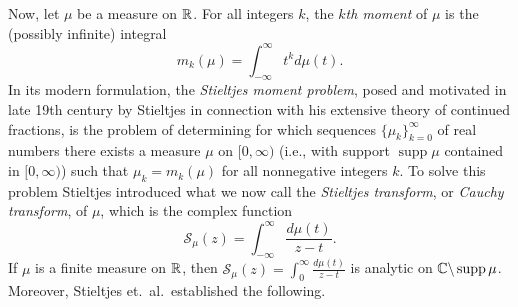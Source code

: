 \documentclass[12pt]{article}
\begin{document}
Now, let $\mu$ be a measure on ${\mathbb R}$. For all integers $k$, the {\it $k$th moment} of $\mu$ is the (possibly infinite) integral
$$m_k(\mu) = \int_{-\infty}^\infty t^k d \mu(t).$$  In its modern formulation, the {\it Stieltjes moment problem}, posed and motivated in late 19th century by Stieltjes in connection with his extensive theory of continued fractions, is the problem of determining for which sequences $\{\mu_k\}_{k = 0}^\infty$ of real numbers there exists a measure $\mu$ on $[0, \infty)$ (i.e., with support $\operatorname{supp} \mu$ contained in $[0,\infty)$) such that $\mu_k = m_k(\mu)$ for all nonnegative integers $k$.  To solve this problem Stieltjes introduced what we now call the {\it Stieltjes transform}, or {\it Cauchy transform},  of $\mu$, which is the complex function
$${\mathcal S}_\mu(z) = \int_{-\infty}^\infty \frac{d \mu(t)}{z-t}.$$   
If $\mu$ is a finite measure on ${\mathbb R}$, then ${\mathcal S}_\mu(z) = \int_0^\infty \frac{d \mu(t)}{z-t}$ is analytic on ${\mathbb C}\backslash \operatorname{supp} \mu$.  Moreover, Stieltjes et.\ al.\ established the following.
\end{document}
